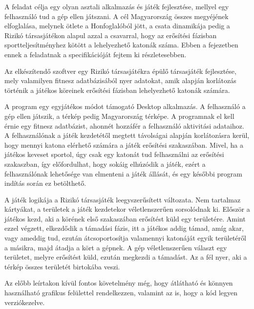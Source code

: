 A feladat célja egy olyan asztali alkalmazás és játék fejlesztése, mellyel egy felhasználó tud a gép ellen játszani.
A cél Magyarország összes megyéjének elfoglalása, melynek ötlete a Honfoglalóból jött, a csata dinamikája pedig a Rizikó társasjátékon alapul azzal a csavarral, hogy az erősítési fázisban sportteljesítményhez kötött a lehelyezhető katonák száma.
Ebben a fejezetben ennek a feladatnak a specifikációját fejtem ki részletesebben.

Az elkészítendő szoftver egy Rizikó társasjátékra épülő társasjáték fejlesztése, mely valamilyen fitnesz  adatbázisából nyer adatokat, amik alapján korlátozás történik a játékos köreinek erősítési fázisban lehelyezhető katonák számára.

A program egy egyjátékos módot támogató Desktop alkalmazás.
A felhasználó a gép ellen játszik, a térkép pedig Magyarország térképe.
A programnak el kell érnie egy fitnesz adatbázist, ahonnét hozzáfér a felhasználó aktivitási adataihoz.
A felhasználónak a játék kezdetétől megtett távolságai alapján korlátozásra kerül, hogy mennyi katona elérhető számára a játék erősítési szakaszában.
Mivel, ha a játékos keveset sportol, úgy csak egy katonát tud felhasználni az erősítési szakaszban, így előfordulhat, hogy sokáig elhúzódik a játék, ezért a   felhasználónak lehetősége van elmenteni a játék állását, és egy későbbi program indítás során ez betölthető.

A játék logikája a Rizikó társasjáték leegyszerűsített változata.
Nem tartalmaz kártyákat, a területek a játék kezdetekor véletlenszerűen sorsolódnak ki.
Először a játékos kezd, aki a körének első szakaszában erősítést küld egy területére.
Amint ezzel végzett, elkezdődik a támadási fázis, itt a játékos addig támad, amíg akar, vagy ameddig tud, ezután átcsoportosítja valamennyi katonáját egyik területéről a másikra, majd átadja a kört a gépnek.
A gép véletlenszerűen választ egy területet, melyre erősítést küld, ezután megkezdi a támadást.
Az a fél nyer, aki a térkép összes területét birtokába veszi.

Az előbb leírtakon kívül fontos követelmény még, hogy átlátható és könnyen használható grafikus felülettel rendelkezzen, valamint az is, hogy a kód legyen verziókezelve.